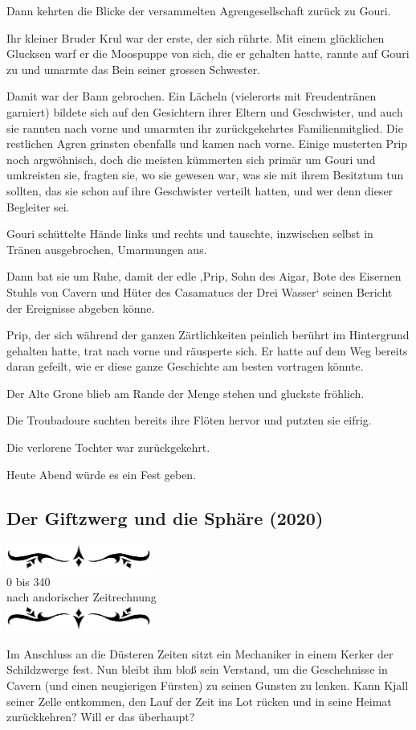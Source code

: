 \documentclass[10pt, a4paper, oneside]{book}
\newcommand{\az}[1]{%
    \begin{center}
        \includegraphics[width=180px]{Das Erbe des Wunderkindes/verzierung1.png}\\
        {\Huge #1} \\
        {nach andorischer Zeitrechnung}\\
        \includegraphics[width=180px]{Das Erbe des Wunderkindes/verzierung2.png}
    \end{center}
    \extramarks{}{#1 a.Z.}
}
\begin{document}
Dann kehrten die Blicke der versammelten Agrengesellschaft zurück zu Gouri.

Ihr kleiner Bruder Krul war der erste, der sich rührte. Mit einem glücklichen Glucksen warf er die Moospuppe von sich, die er gehalten hatte, rannte auf Gouri zu und umarmte das Bein seiner grossen Schwester.

Damit war der Bann gebrochen. Ein Lächeln (vielerorts mit Freudentränen garniert) bildete sich auf den Gesichtern ihrer Eltern und Geschwister, und auch sie rannten nach vorne und umarmten ihr zurückgekehrtes Familienmitglied. Die restlichen Agren grinsten ebenfalls und kamen nach vorne. Einige musterten Prip noch argwöhnisch, doch die meisten kümmerten sich primär um Gouri und umkreisten sie, fragten sie, wo sie gewesen war, was sie mit ihrem Besitztum tun sollten, das sie schon auf ihre Geschwister verteilt hatten, und wer denn dieser Begleiter sei.

Gouri schüttelte Hände links und rechts und tauschte, inzwischen selbst in Tränen ausgebrochen, Umarmungen aus.

Dann bat sie um Ruhe, damit der edle ‚Prip, Sohn des Aigar, Bote des Eisernen Stuhls von Cavern und Hüter des Casamatucs der Drei Wasser‘ seinen Bericht der Ereignisse abgeben könne.

Prip, der sich während der ganzen Zärtlichkeiten peinlich berührt im Hintergrund gehalten hatte, trat nach vorne und räusperte sich. Er hatte auf dem Weg bereits daran gefeilt, wie er diese ganze Geschichte am besten vortragen könnte.

Der Alte Grone blieb am Rande der Menge stehen und gluckste fröhlich.

Die Troubadoure suchten bereits ihre Flöten hervor und putzten sie eifrig.

Die verlorene Tochter war zurückgekehrt.

Heute Abend würde es ein Fest geben.







\begin{chapterbox}
    \chapter{Der Giftzwerg und die Sphäre (2020)}
    \label{Der Giftzwerg und die Sphäre (2020)}
    \az{0 bis 340}
    
    Im Anschluss an die Düsteren Zeiten sitzt ein Mechaniker in einem Kerker der Schildzwerge fest. Nun bleibt ihm bloß sein Verstand, um die Geschehnisse in Cavern (und einen neugierigen Fürsten) zu seinen Gunsten zu lenken. Kann Kjall seiner Zelle entkommen, den Lauf der Zeit ins Lot rücken und in seine Heimat zurückkehren? Will er das überhaupt?
\end{chapterbox}
\end{document}
